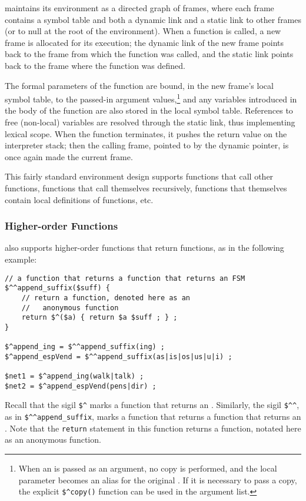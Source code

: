 \Kleene{} maintains its environment as a directed graph of frames,
where each frame
contains a symbol table and both a dynamic link and a static link to other frames (or to null at the root of the environment).  When a function is called, a new
frame is allocated for its execution; the dynamic link of the
new frame points back to the frame
from which the function was called, and the static link points back to the
frame where the function was defined.  

The formal parameters of the function are bound, in the new frame's local
symbol table, to the passed-in argument values,\footnote{When an \fsm{} is passed as an argument, no copy is performed, and the local
parameter becomes an alias for the original \fsm{}.  If it is
necessary to pass a copy, the explicit \verb!$^copy()! function can be used
in the argument list.}  and any variables introduced in
the body of the function are also stored in the local symbol
table.  References to free (non-local) variables are resolved
through the static link, thus implementing lexical scope.  When the
function terminates, it pushes the return value on the interpreter stack; then
the calling frame, pointed to by the dynamic
pointer, is once again made the current frame.

This fairly standard environment design supports functions that call other
functions, functions that call themselves recursively, functions
that themselves contain local definitions of functions, etc.  

\subsubsection{Higher-order Functions}

\Kleene{} also supports higher-order functions that return functions,
as in the following example:

\begin{Verbatim}
// a function that returns a function that returns an FSM 
$^^append_suffix($suff) {
    // return a function, denoted here as an
    //   anonymous function
    return $^($a) { return $a $suff ; } ;
}

$^append_ing = $^^append_suffix(ing) ;
$^append_espVend = $^^append_suffix(as|is|os|us|u|i) ;

$net1 = $^append_ing(walk|talk) ;
$net2 = $^append_espVend(pens|dir) ;
\end{Verbatim}

\noindent Recall that the sigil \verb!$^! marks a function that returns an \fsm{}.
Similarly, the sigil \verb!$^^!, as in \verb!$^^append_suffix!, marks a function that
returns a function that returns an \fsm{}.  Note that the \texttt{return} statement in
this function returns a function, notated here as an anonymous function.


